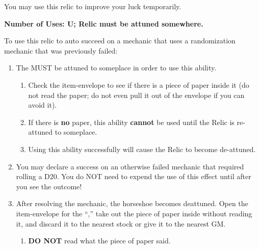 \documentclass[green]{GL2020}
\begin{document}
\name{\gLuckRelic{}}

You may use this relic to improve your luck temporarily.

\textbf{Number of Uses: U; Relic must be attuned somewhere.}

To use this relic to auto succeed on a mechanic that uses a randomization mechanic that was previously failed:
\begin{enumerate}
  \item The \iHorseshoe{} MUST be attuned to someplace in order to use this ability.
  \begin{enumerate}
    \item Check the item-envelope to see if there is a piece of paper inside it (do not read the paper; do not even pull it out of the envelope if you can avoid it).
    \item If there is \textbf{no} paper, this ability \textbf{cannot} be used until the Relic is re-attuned to someplace.
    \item Using this ability successfully will cause the Relic to become de-attuned.
  \end{enumerate}
  \item You may declare a success on an otherwise failed mechanic that required rolling a D20. You do NOT need to expend the use of this effect until after you see the outcome!
  \item After resolving the mechanic, the horseshoe becomes deattuned. Open the item-envelope for the ``\iHorseshoe{},'' take out the piece of paper inside without reading it, and discard it to the nearest stock or give it to the nearest GM.
  \begin{enumerate}
    \item \textbf{DO NOT} read what the piece of paper said.
  \end{enumerate}
\end{enumerate}
\end{document}
